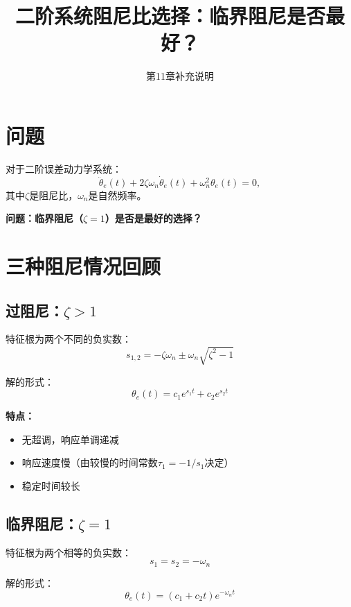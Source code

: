 \documentclass[12pt,a4paper]{article}
\title{二阶系统阻尼比选择：临界阻尼是否最好？}
\author{第11章补充说明}
\date{}
\begin{document}
\maketitle

\section{问题}

对于二阶误差动力学系统：
\begin{equation}
\ddot{\theta}_e(t) + 2\zeta\omega_n \dot{\theta}_e(t) + \omega_n^2 \theta_e(t) = 0,
\end{equation}
其中$\zeta$是阻尼比，$\omega_n$是自然频率。

\textbf{问题：临界阻尼（$\zeta = 1$）是否是最好的选择？}

\section{三种阻尼情况回顾}

\subsection{过阻尼：$\zeta > 1$}

特征根为两个不同的负实数：
\begin{equation}
s_{1,2} = -\zeta\omega_n \pm \omega_n\sqrt{\zeta^2 - 1}
\end{equation}

解的形式：
\begin{equation}
\theta_e(t) = c_1 e^{s_1 t} + c_2 e^{s_2 t}
\end{equation}

\textbf{特点：}
\begin{itemize}
\item 无超调，响应单调递减
\item 响应速度慢（由较慢的时间常数$\tau_1 = -1/s_1$决定）
\item 稳定时间较长
\end{itemize}

\subsection{临界阻尼：$\zeta = 1$}

特征根为两个相等的负实数：
\begin{equation}
s_1 = s_2 = -\omega_n
\end{equation}

解的形式：
\begin{equation}
\theta_e(t) = (c_1 + c_2 t)e^{-\omega_n t}
\end{equation}
\end{document}
